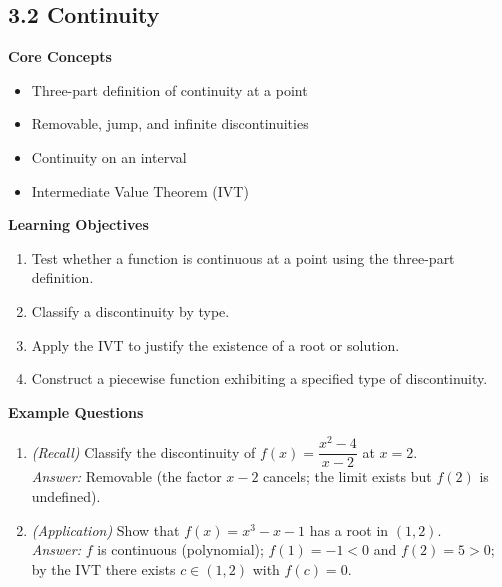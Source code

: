 \documentclass[11pt]{article}
\begin{document}
\subsection{3.2 Continuity}
\textbf{Core Concepts}
\begin{itemize}
\item Three-part definition of continuity at a point
\item Removable, jump, and infinite discontinuities
\item Continuity on an interval
\item Intermediate Value Theorem (IVT)
\end{itemize}
\textbf{Learning Objectives}
\begin{enumerate}
\item Test whether a function is continuous at a point using the three-part definition.
\item Classify a discontinuity by type.
\item Apply the IVT to justify the existence of a root or solution.
\item Construct a piecewise function exhibiting a specified type of discontinuity.
\end{enumerate}
\textbf{Example Questions}
\begin{enumerate}
\item \emph{(Recall)} Classify the discontinuity of $f(x) = \dfrac{x^2-4}{x-2}$ at $x=2$. \\
\textit{Answer:} Removable (the factor $x-2$ cancels; the limit exists but $f(2)$ is undefined).
\item \emph{(Application)} Show that $f(x) = x^3 - x - 1$ has a root in $(1,2)$. \\
\textit{Answer:} $f$ is continuous (polynomial); $f(1) = -1 < 0$ and $f(2) = 5 > 0$; by the IVT there exists $c\in(1,2)$ with $f(c)=0$.
\end{enumerate}
\end{document}
